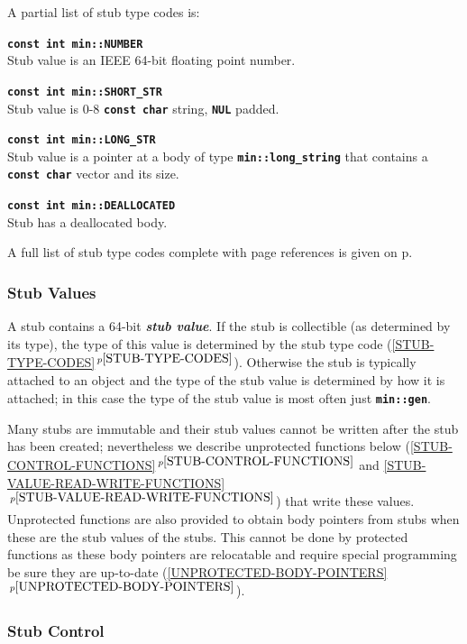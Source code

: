 \documentclass[12pt]{article}
\newcommand{\TT}[1]{{\tt \bfseries #1}}
\newcommand{\key}[1]{{\bf \em #1}\index{#1}}
\newcommand{\itemref}[1]{\ref{#1}$\,^{p\pageref{#1}}$}
\newcommand{\pagref}[1]{p\pageref{#1}}
\newcommand{\EOL}{\penalty \exhyphenpenalty}
\newenvironment{indpar}[1][0.3in]%
	{\begin{list}{}%
		     {\setlength{\itemsep}{0in}%
		      \setlength{\topsep}{0in}%
		      \setlength{\parsep}{1ex}%
		      \setlength{\labelwidth}{#1}%
		      \setlength{\leftmargin}{#1}%
		      \addtolength{\leftmargin}{\labelsep}}%
	 \item}%
	{\end{list}}
\begin{document}
A partial list of stub type codes is:

\begin{indpar}
\begin{list}{}{}
\item[\TT{const int min::NUMBER}]~\\
Stub value is an IEEE 64-bit floating point number.
\item[\TT{const int min::SHORT\_STR}]~\\
Stub value is 0-8 \TT{const char} string, \TT{NUL} padded.
\item[\TT{const int min::LONG\_STR}]~\\
Stub value is a pointer at a body of type \TT{min::long\_\EOL string}
that contains a \TT{const char} vector and its size. 
\item[\TT{const int min::DEALLOCATED}]~\\
Stub has a deallocated body.
\end{list}
\end{indpar}

A full list of stub type codes complete with page references
is given on \pagref{STUB-TYPE-CODE-LIST}.

\subsubsection{Stub Values}
\label{STUB-VALUES}

A stub contains a 64-bit \key{stub value}.  If the stub is collectible
(as determined by its type), the type of this value
is determined by the stub type code (\itemref{STUB-TYPE-CODES}).
Otherwise the stub is typically attached to an object and the type of the stub
value is determined by how it is attached; in this case the type of the
stub value is most often just \TT{min::gen}.

Many stubs are immutable
and their stub values cannot be written after the stub has been created;
nevertheless we describe unprotected functions
below (\itemref{STUB-CONTROL-FUNCTIONS} and
\itemref{STUB-VALUE-READ-WRITE-FUNCTIONS}) that
write these values.  Unprotected functions are also provided to obtain
body pointers from stubs when these are the stub values of the stubs.
This cannot be done by protected
functions as these body pointers are relocatable and require special
programming be sure they are up-to-date (\itemref{UNPROTECTED-BODY-POINTERS}).

\subsubsection{Stub Control}
\label{STUB-CONTROL}
\end{document}
